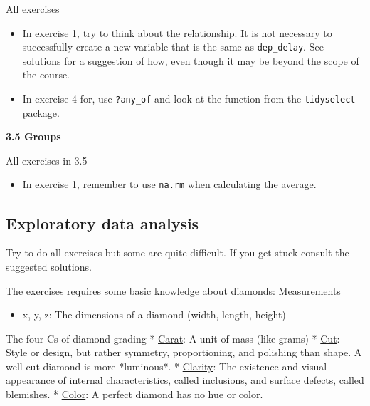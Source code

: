 \documentclass[
  letterpaper,
  DIV=11,
  numbers=noendperiod]{scrreprt}
\providecommand{\tightlist}{%
  \setlength{\itemsep}{0pt}\setlength{\parskip}{0pt}}\usepackage{longtable,booktabs,array}
\begin{document}
All exercises

\begin{itemize}
\tightlist
\item
  In exercise 1, try to think about the relationship. It is not
  necessary to successfully create a new variable that is the same as
  \texttt{dep\_delay}. See solutions for a suggestion of how, even
  though it may be beyond the scope of the course.
\item
  In exercise 4 for, use \texttt{?any\_of} and look at the function from
  the \texttt{tidyselect} package.
\end{itemize}

\textbf{3.5 Groups}

All exercises in 3.5

\begin{itemize}
\tightlist
\item
  In exercise 1, remember to use \texttt{na.rm} when calculating the
  average.
\end{itemize}

\subsection*{Exploratory data analysis}\label{exploratory-data-analysis}

Try to do all exercises but some are quite difficult. If you get stuck
consult the suggested solutions.

The exercises requires some basic knowledge about
\href{https://en.wikipedia.org/wiki/Diamond}{diamonds}: Measurements

\begin{itemize}
\tightlist
\item
  x, y, z: The dimensions of a diamond (width, length, height)
\end{itemize}

The four Cs of diamond grading *
\href{https://en.wikipedia.org/wiki/Carat_(mass)}{Carat}: A unit of mass
(like grams) * \href{https://en.wikipedia.org/wiki/Diamond_cut}{Cut}:
Style or design, but rather symmetry, proportioning, and polishing than
shape. A well cut diamond is more *luminous*. *
\href{https://en.wikipedia.org/wiki/Diamond_clarity}{Clarity}: The
existence and visual appearance of internal characteristics, called
inclusions, and surface defects, called blemishes. *
\href{https://en.wikipedia.org/wiki/Diamond_color}{Color}: A perfect
diamond has no hue or color.
\end{document}
